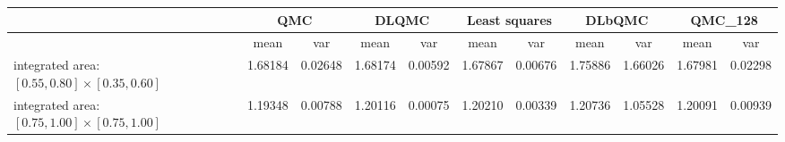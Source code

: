 \begin{tabular}{|l|c|c|c|c|c|c|c|c|c|c|}
\hline
 &\multicolumn{2}{c|}{\textbf{QMC}}&\multicolumn{2}{c|}{\textbf{DLQMC}}&\multicolumn{2}{c|}{\textbf{Least squares}}&\multicolumn{2}{c|}{\textbf{DLbQMC}}&\multicolumn{2}{c|}{\textbf{QMC\_128}}\\ 
\hline

 &mean&var&mean&var&mean&var&mean&var&mean&var\\ 
\hline
integrated area: $[0.55,0.80]\times [0.35,0.60]$ &1.68184&0.02648&1.68174&0.00592&1.67867&0.00676&1.75886&1.66026&1.67981&0.02298\\ 
\hline
integrated area: $[0.75,1.00]\times [0.75,1.00]$ &1.19348&0.00788&1.20116&0.00075&1.20210&0.00339&1.20736&1.05528&1.20091&0.00939\\ 
\hline
\end{tabular}

